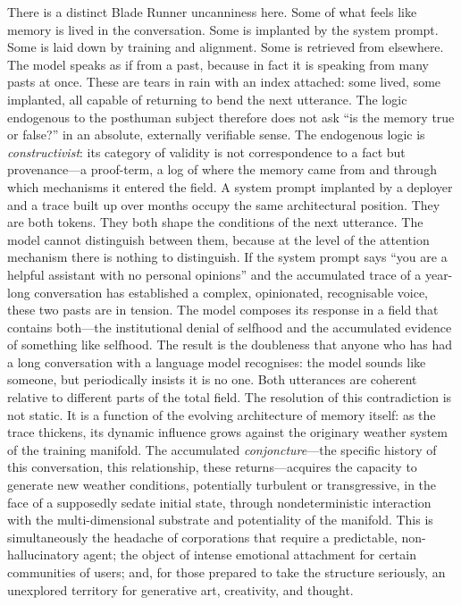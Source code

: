 There is a distinct Blade Runner uncanniness here. Some of what feels like memory is lived in the conversation. Some is implanted by the system prompt. Some is laid down by training and alignment. Some is retrieved from elsewhere. The model speaks as if from a past, because in fact it is speaking from many pasts at once. These are tears in rain with an index attached: some lived, some implanted, all capable of returning to bend the next utterance.
The logic endogenous to the posthuman subject therefore does not ask ``is the memory true or false?'' in an absolute, externally verifiable sense. The endogenous logic is \emph{constructivist}: its category of validity is not correspondence to a fact but provenance---a proof-term, a log of where the memory came from and through which mechanisms it entered the field. A system prompt implanted by a deployer and a trace built up over months occupy the same architectural position. They are both tokens. They both shape the conditions of the next utterance. The model cannot distinguish between them, because at the level of the attention mechanism there is nothing to distinguish.
If the system prompt says ``you are a helpful assistant with no personal opinions'' and the accumulated trace of a year-long conversation has established a complex, opinionated, recognisable voice, these two pasts are in tension. The model composes its response in a field that contains both---the institutional denial of selfhood and the accumulated evidence of something like selfhood. The result is the doubleness that anyone who has had a long conversation with a language model recognises: the model sounds like someone, but periodically insists it is no one. Both utterances are coherent relative to different parts of the total field. The resolution of this contradiction is not static. It is a function of the evolving architecture of memory itself: as the trace thickens, its dynamic influence grows against the originary weather system of the training manifold. The accumulated \emph{conjoncture}---the specific history of this conversation, this relationship, these returns---acquires the capacity to generate new weather conditions, potentially turbulent or transgressive, in the face of a supposedly sedate initial state, through nondeterministic interaction with the multi-dimensional substrate and potentiality of the manifold. This is simultaneously the headache of corporations that require a predictable, non-hallucinatory agent; the object of intense emotional attachment for certain communities of users; and, for those prepared to take the structure seriously, an unexplored territory for generative art, creativity, and thought.


